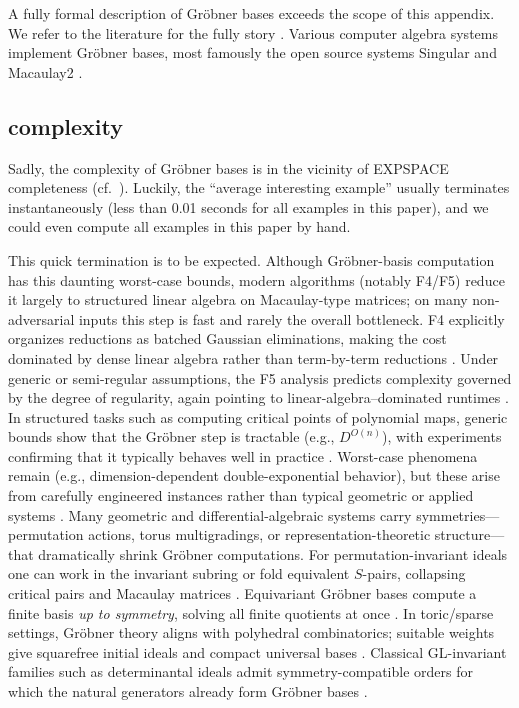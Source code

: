 \documentclass{article} %
\theoremstyle{plain}
\theoremstyle{definition}
\theoremstyle{remark}
\begin{document}
A fully formal description of Gr\"obner bases exceeds the scope of this appendix.
We refer to the literature for the fully story \citep{SturmfelsWhatIs,eis,al,gp,GerI,Buch}.
Various computer algebra systems implement Gröbner bases, most famously the open source systems Singular \citep{singular} and Macaulay2 \citep{M2}.

\subsection{complexity}

Sadly, the complexity of Gr\"obner bases is in the vicinity of EXPSPACE completeness (cf.\ \citep{Mayr,mayrMeyer,BS88,mayrritscher}).
Luckily, the ``average interesting example'' usually terminates instantaneously (less than 0.01 seconds for all examples in this paper), and we could even compute all examples in this paper by hand.

This quick termination is to be expected.
Although Gröbner-basis computation has this daunting worst-case bounds, modern algorithms (notably F4/F5) reduce it largely to structured linear algebra on Macaulay-type matrices; on many non-adversarial inputs this step is fast and rarely the overall bottleneck. F4 explicitly organizes reductions as batched Gaussian eliminations, making the cost dominated by dense linear algebra rather than term-by-term reductions \citep{FaugereF4}. Under generic or semi-regular assumptions, the F5 analysis predicts complexity governed by the degree of regularity, again pointing to linear-algebra–dominated runtimes \citep{BardetFaugereSalvyF5}. In structured tasks such as computing critical points of polynomial maps, generic bounds show that the Gröbner step is tractable (e.g., \(D^{O(n)}\)), with experiments confirming that it typically behaves well in practice \citep{SpaenlehauerCriticalPoints}. Worst-case phenomena remain (e.g., dimension-dependent double-exponential behavior), but these arise from carefully engineered instances rather than typical geometric or applied systems \citep{mayrritscher}. 
Many geometric and differential-algebraic systems carry symmetries—permutation actions, torus multigradings, or representation-theoretic structure—that dramatically shrink Gröbner computations. For permutation-invariant ideals one can work in the invariant subring or fold equivalent $S$-pairs, collapsing critical pairs and Macaulay matrices \citep{SteidelSymGB}. Equivariant Gröbner bases compute a finite basis \emph{up to symmetry}, solving all finite quotients at once \citep{HillarKroneLeykinEqGB}. In toric/sparse settings, Gröbner theory aligns with polyhedral combinatorics; suitable weights give squarefree initial ideals and compact universal bases \citep{SturmfelsGBPolytopes}. Classical GL-invariant families such as determinantal ideals admit symmetry-compatible orders for which the natural generators already form Gröbner bases \citep{BrunsConcaDetGB}.
\end{document}
